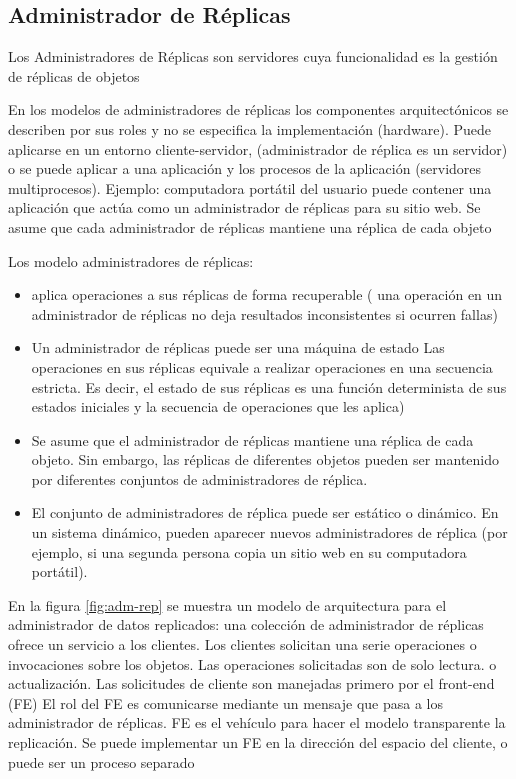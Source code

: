  \subsection{Administrador de Réplicas}
 Los Administradores de Réplicas son servidores cuya funcionalidad es la gestión de réplicas de objetos   

 En los  modelos de  administradores de réplicas  los componentes arquitectónicos se describen por sus roles y no se especifica la implementación (hardware). Puede aplicarse en un entorno cliente-servidor, (administrador de réplica es un servidor) o se puede aplicar a una aplicación y los procesos de la aplicación (servidores multiprocesos).  Ejemplo: computadora portátil del usuario   puede contener una aplicación que actúa como un administrador de réplicas para su sitio web.
 Se asume que cada administrador de réplicas mantiene una réplica de cada objeto 
 
 Los modelo administradores  de réplicas:
 \begin{itemize}
 	\item  aplica operaciones a sus réplicas de forma recuperable ( una operación en un administrador de réplicas no deja resultados inconsistentes si ocurren fallas) 
 	\item  Un administrador de réplicas puede ser una máquina de estado      Las operaciones en sus réplicas equivale a realizar operaciones en una secuencia estricta. Es decir, el estado de sus réplicas es una función determinista de sus estados iniciales y la secuencia de operaciones que les aplica)
	 \item 	Se asume que el administrador de réplicas mantiene una réplica de cada objeto. Sin embargo, las réplicas de diferentes objetos pueden ser mantenido por diferentes conjuntos de administradores de réplica. 
 	\item El conjunto de administradores de réplica puede ser estático o dinámico. En un sistema dinámico, pueden aparecer nuevos administradores de réplica (por ejemplo, si una segunda persona  copia un sitio web en su computadora portátil).
 		
 \end{itemize}


En la figura \ref{fig:adm-rep} se muestra un modelo de arquitectura para el administrador de datos replicados: una colección de administrador de réplicas ofrece un servicio a los clientes. Los clientes  solicitan una serie  operaciones o invocaciones sobre  los objetos.  Las operaciones solicitadas son de solo lectura. o actualización. 
 Las solicitudes de  cliente son manejadas primero por el front-end (FE)
 El rol del FE es comunicarse mediante un mensaje que pasa a los  administrador de réplicas.
 FE es el  vehículo para hacer el modelo transparente la replicación.
 Se puede implementar un FE en la dirección del espacio del cliente, o puede ser un proceso separado 
 
